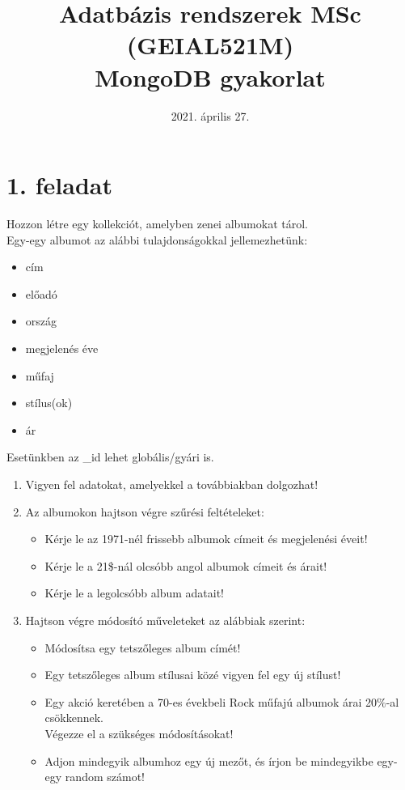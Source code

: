\documentclass[a4paper, 12pt]{article}
\title{\vskip -30pt Adatbázis rendszerek MSc (GEIAL521M)\\\LARGE{\textbf{MongoDB gyakorlat}}}
\date{\vskip -30pt 2021. április 27.}
\author{}
\begin{document}
\maketitle

\section*{1. feladat}
Hozzon létre egy kollekciót, amelyben zenei albumokat tárol.\\
Egy-egy albumot az alábbi tulajdonságokkal jellemezhetünk:
\begin{itemize}[noitemsep]
	\item cím
	\item előadó
	\item ország
	\item megjelenés éve
	\item műfaj
	\item stílus(ok)
	\item ár
\end{itemize}
Esetünkben az \_id lehet globális/gyári is.

\begin{enumerate}[label=\textbf{\alph*)}]
\item Vigyen fel adatokat, amelyekkel a továbbiakban dolgozhat!
\item Az albumokon hajtson végre szűrési feltételeket:
	  \begin{itemize}[label=-]
	  \item Kérje le az 1971-nél frissebb albumok címeit és megjelenési éveit!
	  \item Kérje le a 21\$-nál olcsóbb angol albumok címeit és árait!
	  \item Kérje le a legolcsóbb album adatait!
	  \end{itemize}
\item Hajtson végre módosító műveleteket az alábbiak szerint:
	  \begin{itemize}[label=-]
	  \item Módosítsa egy tetszőleges album címét!
	  \item Egy tetszőleges album stílusai közé vigyen fel egy új stílust!
	  \item Egy akció keretében a 70-es évekbeli Rock műfajú albumok árai 20$\%$-al csökkennek.\\Végezze el a szükséges módosításokat!
	  \item Adjon mindegyik albumhoz egy új mezőt, és írjon be mindegyikbe egy-egy random számot!
	  \end{itemize}
\end{enumerate}
\end{document}

